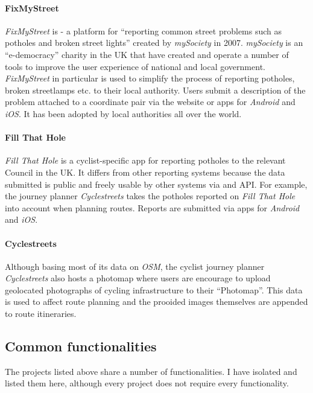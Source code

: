\documentclass{article}
\begin{document}
		\paragraph{FixMyStreet}
		\textit{FixMyStreet} is - a platform for ``reporting common street problems such as potholes and broken street lights''\cite{_mysociety/fixmystreet_2015} created by \textit{mySociety} in 2007. \textit{mySociety} is an ``e-democracy'' charity in the UK that have created and operate a number of tools to improve the user experience of national and local government. \textit{FixMyStreet} in particular is used to simplify the process of reporting potholes, broken streetlamps etc. to their local authority. Users submit a description of the problem attached to a coordinate pair via the website or apps for \textit{Android} and \textit{iOS}. It has been adopted by local authorities all over the world.

		\paragraph{Fill That Hole}
		\textit{Fill That Hole} is a cyclist-specific app for reporting potholes to the relevant Council in the UK. It differs from other reporting systems because the data submitted is public and freely usable by other systems via and API. For example, the journey planner \textit{Cyclestreets} takes the potholes reported on \textit{Fill That Hole} into account when planning routes. Reports are submitted via apps for \textit{Android} and \textit{iOS}.

		\paragraph{Cyclestreets}
		Although basing most of its data on \textit{OSM}, the cyclist journey planner \textit{Cyclestreets} also hosts a photomap where users are encourage to upload geolocated photographs of cycling infrastructure to their ``Photomap''. This data is used to affect route planning and the prooided images themselves are appended to route itineraries\cite{_cyclestreets_????}.

		\subsection{Common functionalities}

		The projects listed above share a number of functionalities. I have isolated and listed them here, although every project does not require every functionality.
\end{document}
